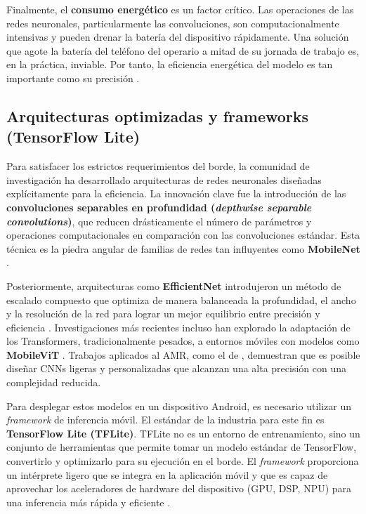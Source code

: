 Finalmente, el \textbf{consumo energético} es un factor crítico. Las operaciones de las redes neuronales, particularmente las convoluciones, son computacionalmente intensivas y pueden drenar la batería del dispositivo rápidamente. Una solución que agote la batería del teléfono del operario a mitad de su jornada de trabajo es, en la práctica, inviable. Por tanto, la eficiencia energética del modelo es tan importante como su precisión \parencite{Poddar2024Survey}.

\subsection{Arquitecturas optimizadas y frameworks (TensorFlow Lite)}
\label{ssec:efficient_architectures_frameworks}

Para satisfacer los estrictos requerimientos del borde, la comunidad de investigación ha desarrollado arquitecturas de redes neuronales diseñadas explícitamente para la eficiencia. La innovación clave fue la introducción de las \textbf{convoluciones separables en profundidad (\textit{depthwise separable convolutions})}, que reducen drásticamente el número de parámetros y operaciones computacionales en comparación con las convoluciones estándar. Esta técnica es la piedra angular de familias de redes tan influyentes como \textbf{MobileNet} \parencite{Poddar2024Survey}.

Posteriormente, arquitecturas como \textbf{EfficientNet} introdujeron un método de escalado compuesto que optimiza de manera balanceada la profundidad, el ancho y la resolución de la red para lograr un mejor equilibrio entre precisión y eficiencia \parencite{Tan2021EfficientNetV2}. Investigaciones más recientes incluso han explorado la adaptación de los Transformers, tradicionalmente pesados, a entornos móviles con modelos como \textbf{MobileViT} \parencite{Mehta2022MobileViT}. Trabajos aplicados al AMR, como el de \textcite{Zou2021}, demuestran que es posible diseñar CNNs ligeras y personalizadas que alcanzan una alta precisión con una complejidad reducida.

Para desplegar estos modelos en un dispositivo Android, es necesario utilizar un \textit{framework} de inferencia móvil. El estándar de la industria para este fin es \textbf{TensorFlow Lite (TFLite)}. TFLite no es un entorno de entrenamiento, sino un conjunto de herramientas que permite tomar un modelo estándar de TensorFlow, convertirlo y optimizarlo para su ejecución en el borde. El \textit{framework} proporciona un intérprete ligero que se integra en la aplicación móvil y que es capaz de aprovechar los aceleradores de hardware del dispositivo (GPU, DSP, NPU) para una inferencia más rápida y eficiente \parencite{Albonico2023Benchmarking, Santiago2020Deployment}.

